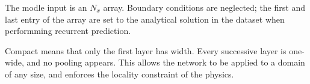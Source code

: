 \documentclass{article}
\begin{document}

The modle input is an $N_x$ array. Boundary conditions are neglected;
the first and last entry of the array are set to the analytical
solution in the dataset when performming recurrent prediction.





Compact means that only the first layer has width. Every successive
layer is one-wide, and no pooling appears. This allows the network to
be applied to a domain of any size, and enforces the locality
constraint of the physics.
\end{document}
